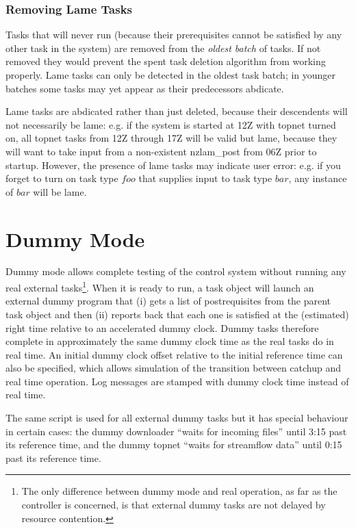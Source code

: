 \documentclass[11pt,a4paper]{article}
\begin{document}
\subsubsection{Removing Lame Tasks} 

Tasks that will never run (because their prerequisites cannot be
satisfied by any other task in the system) are removed from the {\em
oldest batch} of tasks.  If not removed they would prevent the spent
task deletion algorithm from working properly. Lame tasks can only be
detected in the oldest task batch; in younger batches some tasks may yet
appear as their predecessors abdicate.

Lame tasks are abdicated rather than just deleted, because their
descendents will not necessarily be lame: e.g. if the system is started
at 12Z with topnet turned on, all topnet tasks from 12Z through 17Z will
be valid but lame, because they will want to take input from a
non-existent nzlam\_post from 06Z prior to startup. However, the
presence of lame tasks may indicate user error: e.g. if you forget
to turn on task type $foo$ that supplies input to task type $bar$,
any instance of $bar$ will be lame.


\section{Dummy Mode}

Dummy mode allows complete testing of the control system without running
any real external tasks\footnote{The only difference between dummy mode
and real operation, as far as the controller is concerned, is that
external dummy tasks are not delayed by resource contention.}. When it
is ready to run, a task object will launch an external dummy program
that (i) gets a list of postrequisites from the parent task object and
then (ii) reports back that each one is satisfied at the (estimated)
right time relative to an accelerated dummy clock. Dummy tasks therefore
complete in approximately the same dummy clock time as the real tasks do
in real time. An initial dummy clock offset relative to the initial
reference time can also be specified, which allows simulation of the
transition between catchup and real time operation. Log messages are
stamped with dummy clock time instead of real time.

The same script is used for all external dummy tasks but it has special
behaviour in certain cases: the dummy downloader ``waits for incoming
files'' until 3:15 past its reference time, and the dummy topnet ``waits
for streamflow data'' until 0:15 past its reference time.
\end{document}
